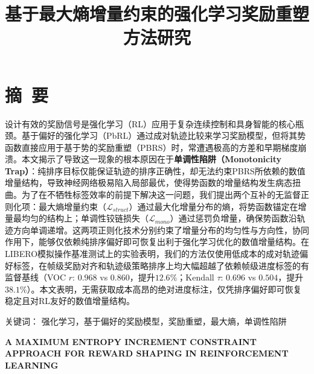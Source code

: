 

\renewcommand{\mytitle}{基于最大熵增量约束的强化学习奖励重塑方法研究}
\renewcommand{\mytitleEN}{A MAXIMUM ENTROPY INCREMENT CONSTRAINT APPROACH FOR REWARD SHAPING IN REINFORCEMENT LEARNING}


\setlength{\baselineskip}{20pt}

\title{\hei{}\bfseries\mytitle}
\maketitle
\thispagestyle{empty}
\clearpage



{\pagestyle{plain}
\tableofcontents
\clearpage}


\section*{摘~要}
设计有效的奖励信号是强化学习（RL）应用于复杂连续控制和具身智能的核心瓶颈。基于偏好的强化学习（PbRL）通过成对轨迹比较来学习奖励模型，但将其势函数直接应用于基于势的奖励重塑（PBRS）时，常遭遇极高的方差和早期梯度崩溃。本文揭示了导致这一现象的根本原因在于\textbf{单调性陷阱（Monotonicity Trap）}：纯排序目标仅能保证轨迹的排序正确性，却无法约束PBRS所依赖的数值增量结构，导致神经网络极易陷入局部最优，使得势函数的增量结构发生病态扭曲。为了在不牺牲标签效率的前提下解决这一问题，我们提出两个互补的无监督正则化项：最大熵增量约束（$\mathcal{L}_{struct}$）通过最大化增量分布的熵，将势函数锚定在增量最均匀的结构上；单调性铰链损失（$\mathcal{L}_{mono}$）通过惩罚负增量，确保势函数沿轨迹方向单调递增。这两项正则化技术分别约束了增量分布的均匀性与方向性，协同作用下，能够仅依赖纯排序偏好即可恢复出利于强化学习优化的数值增量结构。在LIBERO模拟操作基准测试上的实验表明，我们的方法仅使用低成本的成对轨迹偏好标签，在帧级奖励对齐和轨迹级策略排序上均大幅超越了依赖帧级进度标签的有监督基线（VOC $r$: $0.968$ vs $0.860$，提升$12.6\%$；Kendall $\tau$: $0.696$ vs $0.504$，提升$38.1\%$）。本文表明，无需获取成本高昂的绝对进度标注，仅凭排序偏好即可恢复稳定且对RL友好的数值增量结构。

\vspace{1em}\noindent
{\hei 关键词：}
{\song 强化学习，基于偏好的奖励模型，奖励重塑，最大熵，单调性陷阱}
\clearpage



{\centering{}\bfseries\sffamily \mytitleEN\par}
\vspace{1em}
